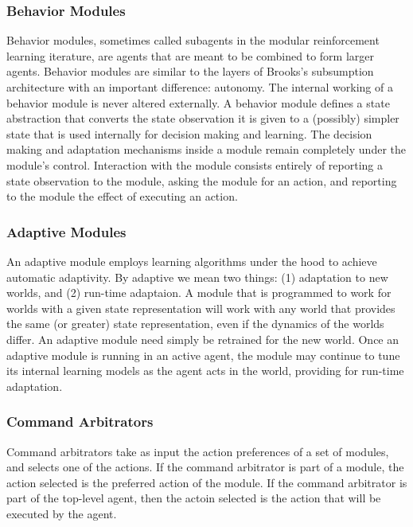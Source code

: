 \subsubsection{Behavior Modules}

Behavior modules, sometimes called subagents in the modular reinforcement learning iterature, are agents that are meant to be combined to form larger agents.  Behavior modules are similar to the layers of Brooks's subsumption architecture with an important difference: autonomy.  The internal working of a behavior module is never altered externally.  A behavior module defines a state abstraction that converts the state observation it is given to a (possibly) simpler state that is used internally for decision making and learning.  The decision making and adaptation mechanisms inside a module remain completely under the module's control.  Interaction with the module consists entirely of reporting a state observation to the module, asking the module for an action, and reporting to the module the effect of executing an action.

\subsubsection{Adaptive Modules}

An adaptive module employs learning algorithms under the hood to achieve automatic adaptivity.  By adaptive we mean two things: (1) adaptation to new worlds, and (2) run-time adaptaion.  A module that is programmed to work for worlds with a given state representation will work with any world that provides the same (or greater) state representation, even if the dynamics of the worlds differ.  An adaptive module need simply be retrained for the new world.  Once an adaptive module is running in an active agent, the module may continue to tune its internal learning models as the agent acts in the world, providing for run-time adaptation.

\subsubsection{Command Arbitrators}

Command arbitrators take as input the action preferences of a set of modules, and selects one of the actions.  If the command arbitrator is part of a module, the action selected is the preferred action of the module.  If the command arbitrator is part of the top-level agent, then the actoin selected is the action that will be executed by the agent.

